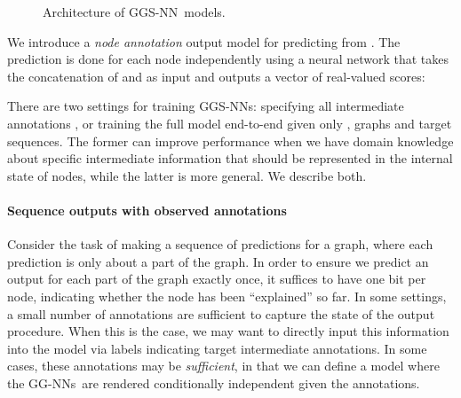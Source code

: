 \documentclass{article} \usepackage{iclr2016_conference,times}
\newcommand{\OurMethodMinorShort}{GG-NN}
\newcommand{\OurMethodMinorShorts}{\OurMethodMinorShort s}
\newcommand{\OurMethodShort}{GGS-NN}
\newcommand{\OurMethodShorts}{\OurMethodShort s}
\begin{document}
\begin{figure}[t]
  \begin{center}
  \end{center}
  \vspace{-2ex}
  \caption{Architecture of \OurMethodShort~models.}
  \vspace{-2ex}
  \label{fig:seq-architecture2}
\end{figure}

We introduce a \emph{node annotation} output model for predicting 
from . The prediction is done for each node independently using
a neural network  that takes the
concatenation of  and  as input and outputs a vector of
real-valued scores:


There are two settings for training \OurMethodShorts: specifying
all intermediate annotations , or training the full model end-to-end given only
, graphs and target sequences.
The former can improve performance when we have domain knowledge about specific
intermediate information that should be represented in the internal state of
nodes, while the latter is more general. We describe both.

\paragraph{Sequence outputs with observed annotations}

Consider the task of making a sequence of predictions for a graph, where each
prediction is only about a part of the graph. In order to
ensure we predict an output for each part of the graph exactly once, it
suffices to have one bit per node, indicating whether the node has been
``explained'' so far.
In some settings, a small number of annotations are sufficient
to capture the state of the output procedure. When this is the case, we
may want to directly input this information into the model via labels
indicating target intermediate annotations. In some cases, these annotations
may be \emph{sufficient}, in that we can define a model where
the \OurMethodMinorShorts~are rendered
conditionally independent given the annotations.
\end{document}
